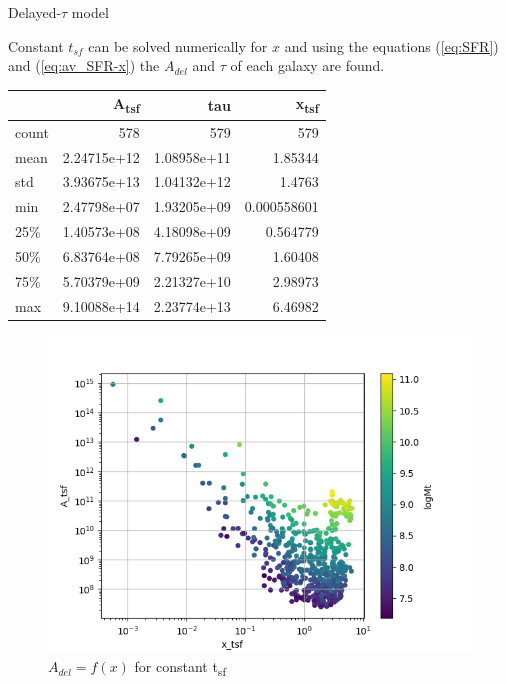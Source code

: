 \documentclass[presentation]{beamer}
\begin{document}
\begin{frame}[label={sec:org05089e9}]{Delayed-\(\tau\) model}
\begin{block}{Constant \(t_{sf}\)}
can be solved numerically for \(x\) and using the equations (\ref{eq:SFR}) and (\ref{eq:av_SFR-x}) the \(A_{del}\) and \(\tau\) of each galaxy are found.

\begin{center}
\begin{tabular}{lrrr}
 & A\textsubscript{tsf} & tau & x\textsubscript{tsf}\\[0pt]
\hline
count & 578 & 579 & 579\\[0pt]
mean & 2.24715e+12 & 1.08958e+11 & 1.85344\\[0pt]
std & 3.93675e+13 & 1.04132e+12 & 1.4763\\[0pt]
min & 2.47798e+07 & 1.93205e+09 & 0.000558601\\[0pt]
25\% & 1.40573e+08 & 4.18098e+09 & 0.564779\\[0pt]
50\% & 6.83764e+08 & 7.79265e+09 & 1.60408\\[0pt]
75\% & 5.70379e+09 & 2.21327e+10 & 2.98973\\[0pt]
max & 9.10088e+14 & 2.23774e+13 & 6.46982\\[0pt]
\end{tabular}
\end{center}

\begin{figure}[!htpb]
\centering
\includegraphics[width=.9\linewidth]{./figs/x-A_tsf.png}
\caption{\label{fig:$A_{del} = f(x)$ for constant t_{sf}}\(A_{del} = f(x)\) for constant t\textsubscript{sf}}
\end{figure}



\end{block}
\end{frame}
\end{document}
